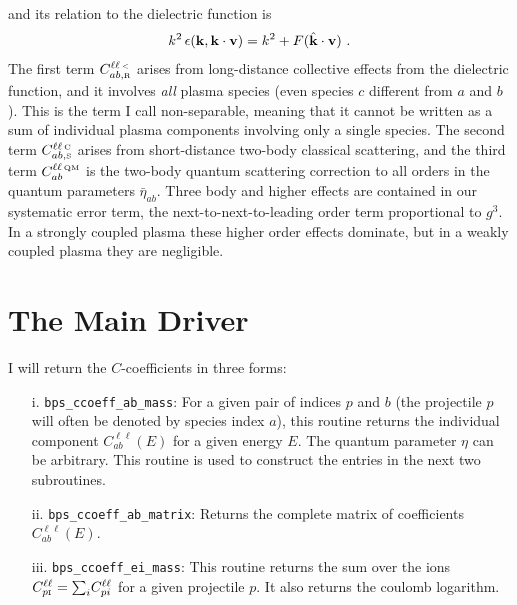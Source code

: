 \documentclass[preprint,12pt,eqsecnum,nofootinbib,amsmath,amssymb]{revtex4}
\newcommand{\smC}{{\rm\scriptscriptstyle C}}
\newcommand{\smI}{{\rm\scriptscriptstyle I}}
\newcommand{\smR}{{\rm\scriptscriptstyle R}}
\newcommand{\smS}{{\rm\scriptscriptstyle S}}
\newcommand{\smQM}{{\rm\scriptscriptstyle QM}}
\newcommand{\smLT}{{\rm\scriptscriptstyle <}}
\begin{document}
and its relation to the dielectric function is 
\begin{eqnarray}
  k^2 \, \epsilon({\bf k} , {\bf k}\cdot {\bf v} ) = k^2 + 
  F(\hat{\bf k} \cdot {\bf v}) \ .
\end{eqnarray}
The first term $C_{ab ,\smR}^{\ell\ell \, \smLT}$ arises from long-distance
collective effects from the dielectric function, and it involves {\em
all} plasma species (even species $c$ different from $a$ and $b$).
This is the term I call non-separable, meaning that it cannot be
written as a sum of individual plasma components involving only a
single species. The second term $C_{ab ,\smS}^{\ell\ell \, \smC}$ arises from
short-distance two-body classical scattering, and the third term
$C_{ab}^{\ell\ell \, \smQM}$ is the two-body quantum scattering correction to
all orders in the quantum parameters $\bar\eta_{ab}$. Three body and
higher effects are contained in our systematic error term, the
next-to-next-to-leading order term proportional to $g^3$. In a
strongly coupled plasma these higher order effects dominate, but in a
weakly coupled plasma they are negligible.

\pagebreak
\section{The Main Driver}

I will return the $C$-coefficients in three forms:
\begin{enumerate}
  \baselineskip 10pt plus 1pt minus 1pt
  \setlength{\itemsep}{3pt} %
  \setlength{\parskip}{1pt} %
  \setlength{\parsep}{0pt}  %

\item[i.] \verb+bps_ccoeff_ab_mass+: For a given pair of indices $p$
and $b$ (the projectile $p$ will often be denoted by species index
$a$), this routine returns the individual component $C^{\ell\ell}_{ab}(E)$
for a given energy $E$. The quantum parameter $\eta$ can be arbitrary. 
This routine is used to construct the entries in the next two subroutines.

\item[ii.] \verb+bps_ccoeff_ab_matrix+: Returns the complete
matrix of coefficients $C^{\ell\ell}_{ab}(E)$. 


\item[iii.] \verb+bps_ccoeff_ei_mass+: This routine returns the sum
over the ions $C^{\ell\ell}_{p\smI}={\sum}_i C^{\ell\ell}_{pi}$ for a given
projectile $p$. It also returns the coulomb logarithm.

\end{enumerate}
\end{document}
